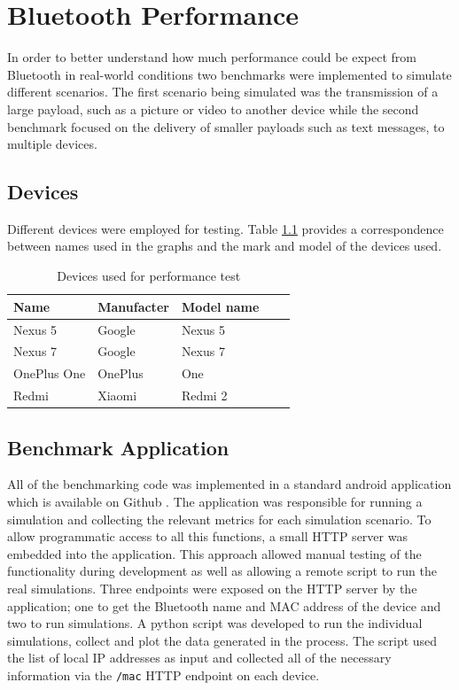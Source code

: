 \chapter{Bluetooth Performance}
In order to better understand how much performance could be expect from Bluetooth in real-world conditions two benchmarks were implemented to simulate different scenarios.
The first scenario being simulated was the transmission of a large payload, such as a picture or video to another device while the second benchmark focused on the delivery of smaller payloads such as text messages, to multiple devices.

\section{Devices}
Different devices were employed for testing. Table \ref{table:devices-used} provides a correspondence between names used in the graphs and the mark and model of the devices used.

\begin{table}[h]
\centering
\caption{Devices used for performance test}
\label{table:devices-used}
\begin{tabular}{lllll}
\hline
Name        & Manufacter        & Model name    \\ \hline
Nexus 5     & Google            & Nexus 5       \\
Nexus 7     & Google            & Nexus 7       \\
OnePlus One & OnePlus           & One           \\
Redmi       & Xiaomi            & Redmi 2       \\ 
\hline
\end{tabular}
\end{table}

\section{Benchmark Application}
All of the benchmarking code was implemented in a standard android application which is available on Github \cite{benchmarking-code}.
The application was responsible for running a simulation and collecting the relevant metrics for each simulation scenario.
To allow programmatic access to all this functions, a small HTTP server \cite{nanohttpd} was embedded into the application.
This approach allowed manual testing of the functionality during development as well as allowing a remote script to run the real simulations.
Three endpoints were exposed on the HTTP server by the application; one to get the Bluetooth name and MAC address of the device and two to run simulations.
A python script was developed to run the individual simulations, collect and plot the data generated in the process.
The script used the list of local IP addresses as input and collected all of the necessary information via the \texttt{/mac} HTTP endpoint on each device.

